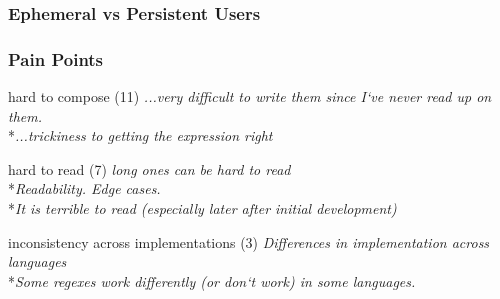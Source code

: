 

\begin{frame}
\frametitle{Ephemeral vs Persistent Users}


\end{frame}


\begin{frame}
\frametitle{Pain Points}
\begin{block}{hard to compose (11)}
\emph{...very difficult to write them since I`ve never read up on them.}
\\*\emph{...trickiness to getting the expression right}
\end{block}
\begin{block}{hard to read (7)}
\emph{long ones can be hard to read}
\\*\emph{Readability. Edge cases.}
\\*\emph{It is terrible to read (especially later after initial development) }
\end{block}
\begin{block}{inconsistency across implementations (3)}
\emph{Differences in implementation across languages}
\\*\emph{Some regexes work differently (or don`t work) in some languages.}
\end{block}
\end{frame}












